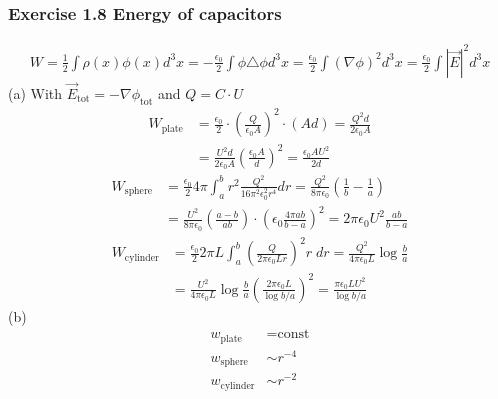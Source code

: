 \documentclass[10pt,a4paper]{article}
\theoremstyle{definition}
\begin{document}
\subsubsection{Exercise 1.8 Energy of capacitors}
\begin{align}
W
=\frac{1}{2}\int\rho(x)\phi(x)d^3x
=-\frac{\epsilon_0}{2}\int\phi\triangle\phi d^3x
=\frac{\epsilon_0}{2}\int(\nabla\phi)^2 d^3x
=\frac{\epsilon_0}{2}\int|\vec{E}|^2 d^3x
\end{align}
(a) With $\vec{E}_\text{tot}=-\nabla\phi_\text{tot}$ and $Q=C\cdot U$
\begin{align}
W_\text{plate}&=\frac{\epsilon_0}{2}\cdot\left(\frac{Q}{\epsilon_0A}\right)^2\cdot(Ad)=\frac{Q^2d}{2\epsilon_0A}\\
&=\frac{U^2d}{2\epsilon_0A}\left(\frac{\epsilon_0A}{d}\right)^2=
\frac{\epsilon_0AU^2}{2d}
\end{align}
\begin{align}
W_\text{sphere}&=\frac{\epsilon_0}{2}4\pi\int_a^br^2\frac{Q^2}{16\pi^2\epsilon_0^2r^4}dr=\frac{Q^2}{8\pi\epsilon_0}\left(\frac{1}{b}-\frac{1}{a}\right)\\
&=\frac{U^2}{8\pi\epsilon_0}\left(\frac{a-b}{ab}\right)\cdot\left(\epsilon_0\frac{4\pi ab}{b-a}\right)^2=2\pi\epsilon_0U^2\frac{ab}{b-a}
\end{align}
\begin{align}
W_\text{cylinder}&=\frac{\epsilon_0}{2}2\pi L\int_a^b\left(\frac{Q}{2\pi\epsilon_0Lr}\right)^2r\;dr
=\frac{Q^2}{4\pi\epsilon_0L}\log\frac{b}{a}\\
&=\frac{U^2}{4\pi\epsilon_0L}\log\frac{b}{a}\left(\frac{2\pi\epsilon_0 L}{\log b/a}\right)^2=\frac{\pi\epsilon_0LU^2}{\log b/a}
\end{align}
(b) 
\begin{align}
w_\text{plate}&=\text{const}\\
w_\text{sphere}&\sim r^{-4}\\
w_\text{cylinder}&\sim r^{-2}
\end{align}
\end{document}
